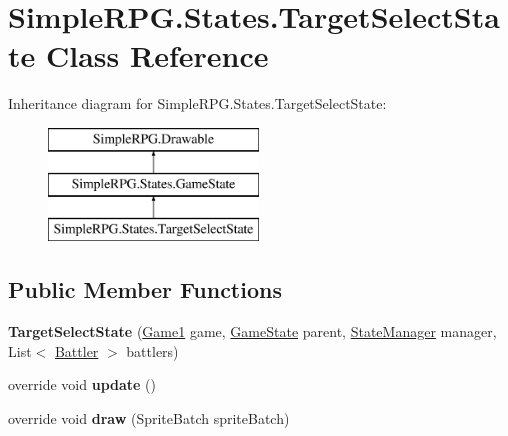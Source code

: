 \hypertarget{class_simple_r_p_g_1_1_states_1_1_target_select_state}{\section{Simple\+R\+P\+G.\+States.\+Target\+Select\+State Class Reference}
\label{class_simple_r_p_g_1_1_states_1_1_target_select_state}
}
Inheritance diagram for Simple\+R\+P\+G.\+States.\+Target\+Select\+State\+:\begin{figure}[H]
\begin{center}
\leavevmode
\includegraphics[height=3.000000cm]{class_simple_r_p_g_1_1_states_1_1_target_select_state}
\end{center}
\end{figure}
\subsection*{Public Member Functions}
\begin{DoxyCompactItemize}
\item 
\hypertarget{class_simple_r_p_g_1_1_states_1_1_target_select_state_abc7562e63e14f09da3ca852ff0b90435}{{\bfseries Target\+Select\+State} (\hyperlink{class_simple_r_p_g_1_1_game1}{Game1} game, \hyperlink{class_simple_r_p_g_1_1_states_1_1_game_state}{Game\+State} parent, \hyperlink{class_simple_r_p_g_1_1_states_1_1_state_manager}{State\+Manager} manager, List$<$ \hyperlink{class_simple_r_p_g_1_1_battler}{Battler} $>$ battlers)}\label{class_simple_r_p_g_1_1_states_1_1_target_select_state_abc7562e63e14f09da3ca852ff0b90435}

\item 
\hypertarget{class_simple_r_p_g_1_1_states_1_1_target_select_state_a4b729abe4fd79d8e152a2eb8af5042ea}{override void {\bfseries update} ()}\label{class_simple_r_p_g_1_1_states_1_1_target_select_state_a4b729abe4fd79d8e152a2eb8af5042ea}

\item 
\hypertarget{class_simple_r_p_g_1_1_states_1_1_target_select_state_a614028f6f0d57d1f7c7e4e0cf9e879e3}{override void {\bfseries draw} (Sprite\+Batch sprite\+Batch)}\label{class_simple_r_p_g_1_1_states_1_1_target_select_state_a614028f6f0d57d1f7c7e4e0cf9e879e3}

\end{DoxyCompactItemize}
